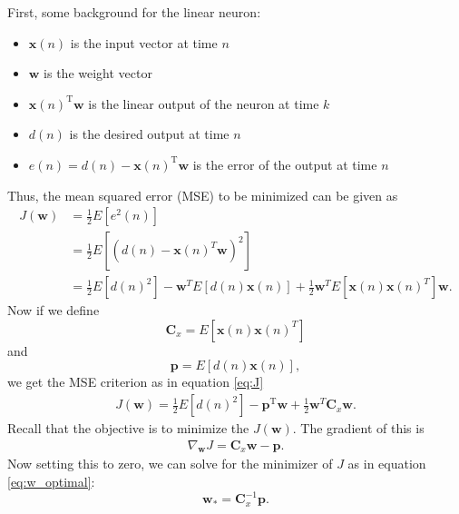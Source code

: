 \begin{enumerate}
\begin{solution}
    First, some background for the linear neuron:
    \begin{itemize}
    \item $\mathbf{x}(n)$ is the input vector at time $n$
    \item $\mathbf{w}$ is the weight vector
    \item $\mathbf{x}(n)^{\mathrm{T}} \mathbf{w}$ is the linear output
      of the neuron at time $k$
    \item $d(n)$ is the desired output at time $n$
    \item $e(n)=d(n)-\mathbf{x}(n)^{\mathrm{T}} \mathbf{w}$ is the
      error of the output at time $n$
    \end{itemize}
    Thus, the mean squared error (MSE) to be minimized can be given as
    \begin{align*}
      J(\mathbf{w}) 
      &=\frac{1}{2}E[e^2(n)]
      \\
      &=\frac{1}{2}E[(d(n)-\mathbf{x}(n)^T\mathbf{w})^2]
      \\
      &=
      \frac{1}{2} E[d(n)^2] - \mathbf{w}^T E[ d(n) \mathbf{x}(n)  ]  + 
      \frac{1}{2} \mathbf{w}^T E[\mathbf{x}(n) \mathbf{x}(n)^T ] \mathbf{w} .
    \end{align*}
    Now if we define 
    \begin{equation*}
      \mathbf{C}_x = E[\mathbf{x}(n) \mathbf{x}(n)^T ]
    \end{equation*}
    and
    \begin{equation*}
      \mathbf{p} = E[d(n) \mathbf{x}(n) ] ,
    \end{equation*}
    we get the MSE criterion as in equation \eqref{eq:J}
    \begin{align*}
      J(\mathbf{w}) = \frac{1}{2} E[d(n)^2] - \mathbf{p}^{\mathrm{T}} \mathbf{w}   + 
      \frac{1}{2} \mathbf{w}^T \mathbf{C}_x \mathbf{w} .
    \end{align*}
    Recall that the objective is to minimize the $J(\mathbf{w})$.  The
    gradient of this is
    \begin{align*}
      \nabla_{\mathbf{w}} J =   \mathbf{C}_x \mathbf{w} - \mathbf{p} .
    \end{align*}
    Now setting this to zero, we can solve for the minimizer of $J$ as
    in equation \eqref{eq:w_optimal}:
    \begin{equation*}
      \mathbf{w}_* = \mathbf{C}_x^{-1} \mathbf{p} .
    \end{equation*}
    \begin{enumerate}

\end{enumerate}
\end{solution}
\end{enumerate}
